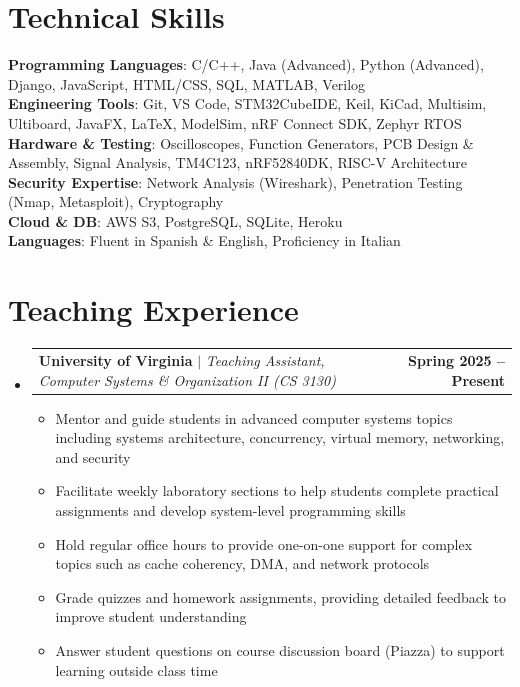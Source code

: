 \documentclass[letterpaper,11pt]{article}
\makeatletter
\newcommand{\resumeItem}[1]{
  \item\small{
    {#1 \vspace{-2pt}}
  }
}
\newcommand{\resumeProjectHeading}[2]{
    \item
    \begin{tabular*}{0.99\textwidth}{l@{\extracolsep{\fill}}r}
      \small#1 & \textbf{\small #2}\\
    \end{tabular*}\vspace{-5pt}
}
\newcommand{\resumeSubHeadingListStart}{\begin{itemize}[leftmargin=0.0in, label={}]}
\newcommand{\resumeSubHeadingListEnd}{\end{itemize}}
\newcommand{\resumeItemListStart}{\begin{itemize}}
\newcommand{\resumeItemListEnd}{\end{itemize}\vspace{-3pt}}
\makeatother
\begin{document}
\section{Technical Skills}
    \begin{itemize}[leftmargin=0.15in, label={}]
        \small{\item{
        \textbf{Programming Languages}{: C/C++, Java (Advanced), Python (Advanced), Django, JavaScript, HTML/CSS, SQL, MATLAB, Verilog} \\
        \textbf{Engineering Tools}{: Git, VS Code, STM32CubeIDE, Keil, KiCad, Multisim, Ultiboard, JavaFX, LaTeX, ModelSim, nRF Connect SDK, Zephyr RTOS} \\
        \textbf{Hardware \& Testing}{: Oscilloscopes, Function Generators, PCB Design \& Assembly, Signal Analysis, TM4C123, nRF52840DK, RISC-V Architecture} \\
        \textbf{Security Expertise}{: Network Analysis (Wireshark), Penetration Testing (Nmap, Metasploit), Cryptography} \\
        \textbf{Cloud \& DB}{: AWS S3, PostgreSQL, SQLite, Heroku} \\
        \textbf{Languages}{: Fluent in Spanish \& English, Proficiency in Italian}
        }}
    \end{itemize}

\section{Teaching Experience}
    \resumeSubHeadingListStart
        \resumeProjectHeading
            {\textbf{University of Virginia} $|$ \emph{Teaching Assistant, Computer Systems \& Organization II (CS 3130)}}{Spring 2025 -- Present}
            \resumeItemListStart
                \resumeItem{Mentor and guide students in advanced computer systems topics including systems architecture, concurrency, virtual memory, networking, and security}
                \resumeItem{Facilitate weekly laboratory sections to help students complete practical assignments and develop system-level programming skills}
                \resumeItem{Hold regular office hours to provide one-on-one support for complex topics such as cache coherency, DMA, and network protocols}
                \resumeItem{Grade quizzes and homework assignments, providing detailed feedback to improve student understanding}
                \resumeItem{Answer student questions on course discussion board (Piazza) to support learning outside class time}
            \resumeItemListEnd
    \resumeSubHeadingListEnd
    
\end{document}
